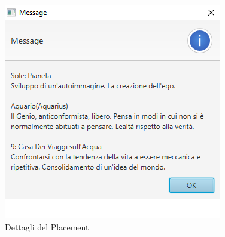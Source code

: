 \begin{enumerate}
\begin{figure}[H]
  \includegraphics[width=\textwidth, height=0.35\textheight, keepaspectratio]{img/c5/PlacementPopup.png}
  \caption{Dettagli del Placement}
  \label{fig:placpop}
  \end{figure}
\end{enumerate}

